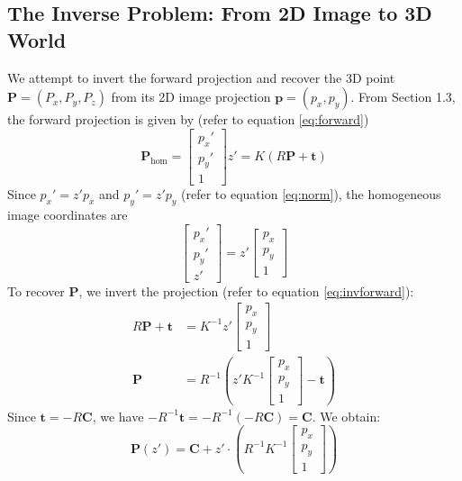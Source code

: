 \documentclass[12pt]{article}
\begin{document}
\subsection{The Inverse Problem: From 2D Image to 3D World} \label{sec:inverse}
We attempt to invert the forward projection and recover the 3D point \( \mathbf{P} = (P_x, P_y, P_z) \) from its 2D image projection \( \mathbf{p} = (p_x, p_y) \). From Section 1.3, the forward projection is given by (refer to equation \eqref{eq:forward})
\begin{equation}
    \mathbf{P}_{\text{hom}} = \begin{bmatrix} p_x' \\ p_y' \\ 1 \end{bmatrix} z' = K (R \mathbf{P} + \mathbf{t}) \label{eq:invforward}
\end{equation}
Since \( p_x' = z' p_x \) and \( p_y' = z' p_y \) (refer to equation \eqref{eq:norm}), the homogeneous image coordinates are
\begin{equation}
    \begin{bmatrix} p_x' \\ p_y' \\ z' \end{bmatrix} = z' \begin{bmatrix} p_x \\ p_y \\ 1 \end{bmatrix} \label{eq:homog}
\end{equation}
To recover \( \mathbf{P} \), we invert the projection (refer to equation \eqref{eq:invforward}):
\begin{align}
    R \mathbf{P} + \mathbf{t} &= K^{-1} z' \begin{bmatrix} p_x \\ p_y \\ 1 \end{bmatrix} \label{eq:inv1} \\
    \mathbf{P} &= R^{-1} \left( z' K^{-1} \begin{bmatrix} p_x \\ p_y \\ 1 \end{bmatrix} - \mathbf{t} \right) \label{eq:inv2}
\end{align}
Since \( \mathbf{t} = -R \mathbf{C} \), we have \( -R^{-1} \mathbf{t} = -R^{-1} (-R \mathbf{C}) = \mathbf{C} \). We obtain:
\begin{equation}
    \mathbf{P}(z') = \mathbf{C} + z' \cdot \left( R^{-1} K^{-1} \begin{bmatrix} p_x \\ p_y \\ 1 \end{bmatrix} \right) \label{eq:invfunc}
\end{equation}
\end{document}
